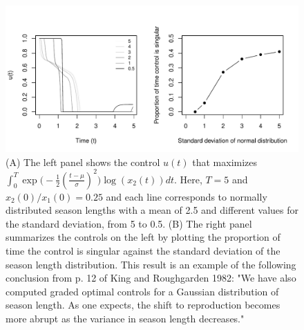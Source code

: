 \documentclass[12pt, oneside]{article}   	%
\begin{document}
 \begin{figure}[h]
   \centering
       \includegraphics[page=1,width=.9\textwidth]{../../figures/kingRoughgardenNormalSummary}  
    \caption{ (A) The left panel shows the control $u(t)$ that maximizes $ \int_0^T  \exp{\big(-\frac{1}{2} (\frac{t-\mu}{\sigma})^2\big)} \log( x_2(t) ) dt. $ Here, $ T=5$ and $x_2(0)/x_1(0) = 0.25$ and each line corresponds to normally distributed season lengths with a mean of 2.5 and different values for the standard deviation, from 5 to 0.5. (B) The right panel summarizes the controls on the left by plotting the proportion of time the control is singular against the standard deviation of the season length distribution. This result is an example of the following conclusion from p. 12 of King and Roughgarden 1982: "We have also computed graded optimal controls for a Gaussian distribution of season length. As one expects, the shift to reproduction becomes more abrupt as the variance in season length decreases." }
 \label{fig:kingRoughgardenFigure4}
\end{figure}
\end{document}
